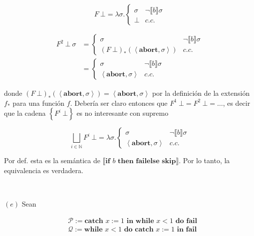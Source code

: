\documentclass[article, 12pt]{article}
\begin{document}
\begin{equation*}
  F ~ \bot = \lambda \sigma . \begin{cases}
    \sigma & \neg\llbracket b \rrbracket\sigma \\ 
    \bot &c.c.
  \end{cases}
\end{equation*}

\begin{align*}
  F^2 ~ \bot ~ \sigma
  &= \begin{cases}
    \sigma & \neg \llbracket b \rrbracket\sigma \\ 
    (F ~ \bot )_* \left( \left<\textbf{abort}, \sigma \right> \right) &c.c.
  \end{cases} \\ 
  &=\begin{cases}
    \sigma & \neg \llbracket  b \rrbracket\sigma \\ 
    \left<\textbf{abort}, \sigma \right> &c.c.
  \end{cases}
\end{align*}

donde $(F ~ \bot )_*\left( \left<\textbf{abort},\sigma \right> \right) =
\left<\textbf{abort}, \sigma \right>$ por la definición de la extensión $f_*$
para una función $f$. Debería ser claro entonces que $F^1 ~ \bot  = F^2 ~ \bot =
\ldots$, es decir que la cadena $\left\{ F^i ~ \bot  \right\} $ es no
interesante con supremo 

\begin{equation*}
  \bigsqcup_{i \in \mathbb{N}} F^i ~ \bot = \lambda \sigma . \begin{cases}
    \sigma & \neg \llbracket b \rrbracket\sigma \\ 
    \left<\textbf{abort}, \sigma \right> &c.c.
  \end{cases} 
\end{equation*}

Por def. esta es la semántica de $\llbracket \textbf{if } b \textbf{ then } \textbf{fail} \textbf{
  else } \textbf{skip} \rrbracket$. Por lo tanto, la equivalencia es verdadera.


  ~


$(e)$ Sean

\begin{align*}
  &\mathcal{P} := \textbf{catch } x := 1 \textbf{ in } \textbf{while } x < 1
  \textbf{ do } \textbf{fail}\\ 
  &\mathcal{Q} := \textbf{while } x < 1 \textbf{ do } \textbf{catch } x:= 1
  \textbf{ in fail}
\end{align*}
\end{document}
